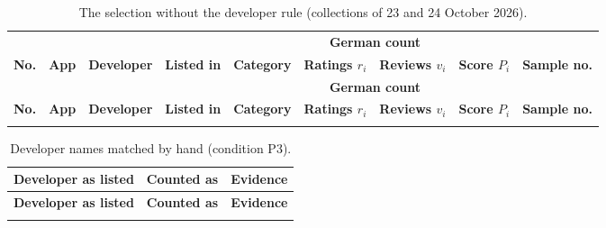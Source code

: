 \begin{landscape}
\begin{singlespace}
\setlength{\tabcolsep}{4pt}
\begin{longtable}{@{}r>{\raggedright\arraybackslash}p{4.4cm}>{\raggedright\arraybackslash}p{3.8cm}llrrrr@{}}
\caption{The selection without the developer rule (collections of 23 and 24
October 2026).}\label{tab:developer-rule}\\
\toprule
 & & & & & \multicolumn{2}{c}{\textbf{German count}} & & \\
\cmidrule(lr){6-7}
\textbf{No.} & \textbf{App} & \textbf{Developer} & \textbf{Listed in} & \textbf{Category} & \textbf{Ratings $r_i$} & \textbf{Reviews $v_i$} & \textbf{Score $P_i$} & \textbf{Sample no.} \\
\midrule
\endfirsthead
\toprule
 & & & & & \multicolumn{2}{c}{\textbf{German count}} & & \\
\cmidrule(lr){6-7}
\textbf{No.} & \textbf{App} & \textbf{Developer} & \textbf{Listed in} & \textbf{Category} & \textbf{Ratings $r_i$} & \textbf{Reviews $v_i$} & \textbf{Score $P_i$} & \textbf{Sample no.} \\
\midrule
\endhead
\bottomrule
\endfoot

\end{longtable}
\end{singlespace}
\end{landscape}

\begin{singlespace}
\small
\setlength{\tabcolsep}{4pt}
\begin{longtable}{@{}>{\raggedright\arraybackslash}p{3.9cm}>{\raggedright\arraybackslash}p{3.9cm}>{\raggedright\arraybackslash}p{5.9cm}@{}}
\caption{Developer names matched by hand (condition P3).}\label{tab:developer-aliases}\\
\toprule
\textbf{Developer as listed} & \textbf{Counted as} & \textbf{Evidence} \\
\midrule
\endfirsthead
\toprule
\textbf{Developer as listed} & \textbf{Counted as} & \textbf{Evidence} \\
\midrule
\endhead
\bottomrule
\endfoot

\end{longtable}
\end{singlespace}
